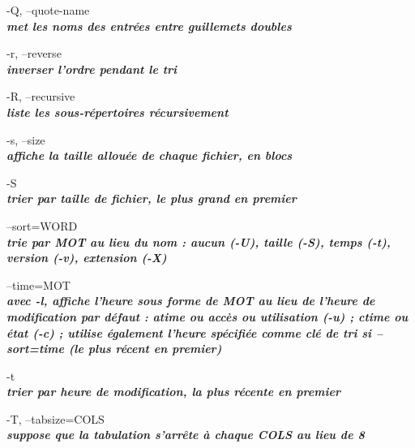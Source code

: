 \documentclass{article}
\begin{document}
        \par-Q, --quote-name\\
              \textit{\textbf{met les noms des entrées entre guillemets doubles}}\\


       \par-r, --reverse\\
               \textit{\textbf{inverser l'ordre pendant le tri}}\\

      \par -R, --recursive\\
              \textit{\textbf{liste les sous-répertoires récursivement}}\\

      \par -s, --size\\
             \textit{\textbf{  affiche la taille allouée de chaque fichier, en blocs}}\\

       \par-S\\          \textit{\textbf{ trier par taille de fichier, le plus grand en premier}}\\

       \par--sort=WORD\\ 
              \textit{\textbf{trie par MOT au lieu du nom : aucun (-U), taille (-S), temps (-t),
              version (-v), extension (-X)}}\\

       \par --time=MOT\\ 
              \textit{\textbf{avec -l, affiche l'heure sous forme de MOT au lieu de l'heure de modification par défaut :
              atime ou accès ou utilisation (-u) ; ctime ou état (-c) ; utilise également
              l'heure spécifiée comme clé de tri si --sort=time (le plus récent en premier)}}\\

   

        \par -t \\      \textit{\textbf{trier par heure de modification, la plus récente en premier}}\\

      \par -T, --tabsize=COLS\\  
              \textit{\textbf{suppose que la tabulation s'arrête à chaque COLS au lieu de 8}}\\
\end{document}

